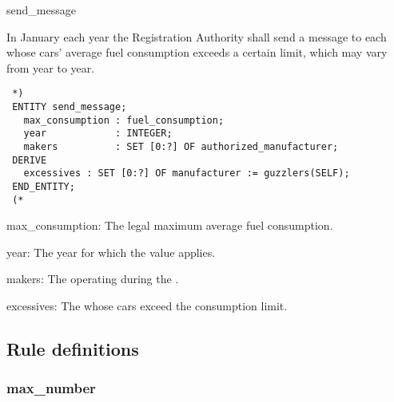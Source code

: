 \documentclass{article}
\begin{document}
 \begin{Mnamedesc}{send_message}

 \begin{Mdesctext}

 In January each year the Registration Authority shall send a message to each
  whose cars' average fuel consumption exceeds a certain
 limit, which may vary from year to year.

 \end{Mdesctext}

 \begin{Mexp}
 \begin{verbatim}
 *)
 ENTITY send_message;
   max_consumption : fuel_consumption;
   year            : INTEGER;
   makers          : SET [0:?] OF authorized_manufacturer;
 DERIVE
   excessives : SET [0:?] OF manufacturer := guzzlers(SELF);
 END_ENTITY;
 (*
 \end{verbatim}
 \end{Mexp}

 \begin{Matts}

 \item[max\_consumption:] The legal maximum average fuel consumption.

 \item[year:] The year for which the  value applies.

 \item[makers:] The  operating during the
 .

 \item[excessives:] The  whose cars exceed the consumption 
 limit. 

 \end{Matts}

 \end{Mnamedesc}

 \subsection{Rule definitions}

 \subsubsection{max\_number}
\end{document}
